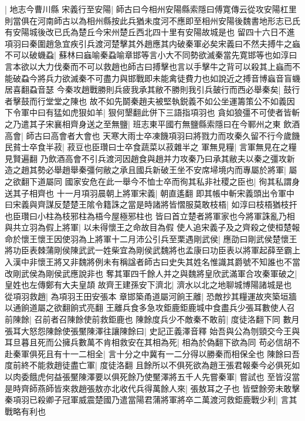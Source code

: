 |{
	地志今曹川縣}
宋義行至安陽|{
	師古曰今相州安陽縣索隱曰傅寛傳云從攻安陽杠里則當俱在河南師古以為相州縣按此兵猶未度河不應即至相州安陽後魏書地形志已氏有安陽城後改已氏為楚丘今宋州楚丘西北四十里有安陽故城是也}
留四十六日不進項羽曰秦圍趙急宜疾引兵渡河楚擊其外趙應其内破秦軍必矣宋義曰不然夫搏牛之蝱不可以破蟣蝨|{
	蘇林曰蝱喻秦蝨喻章邯等言小大不同勢欲滅秦當先寛邯等也如淳曰言本欲以大力伐秦而不可以救趙也師古曰搏擊也言以手擊牛之背可以殺其上蝱而不能破蝨今將兵力欲滅秦不可盡力與邯戰即未能禽徒費力也如說近之搏音博蝱音盲蟣居喜翻蝨音瑟}
今秦攻趙戰勝則兵疲我承其敝不勝則我引兵皷行而西必舉秦矣|{
	鼓行者擊鼓而行堂堂之陳也}
故不如先鬬秦趙夫被堅執鋭義不如公坐運籌策公不如義因下令軍中曰有猛如虎狠如羊|{
	狠何墾翻此併下三語指項羽也}
貪如狼彊不可使者皆斬之乃遣其子宋襄相齊身送之至無鹽|{
	班志東平國冇無鹽縣索隱曰在今鄆州之東}
飲酒高會|{
	師古曰高會者大會也}
天寒大雨士卒凍饑項羽曰將戮力而攻秦久留不行今歲饑民貧士卒食半菽|{
	菽豆也臣瓚曰士卒食蔬菜以菽雜半之}
軍無見糧|{
	言軍無見在之糧見賢遍翻}
乃飲酒高會不引兵渡河因趙食與趙并力攻秦乃曰承其敝夫以秦之彊攻新造之趙其勢必舉趙舉秦彊何敝之承且國兵新破王坐不安席埽境内而專屬於將軍|{
	屬之欲翻下道屬同}
國家安危在此一舉今不恤士卒而徇其私非社稷之臣也|{
	徇其私謂身送其子相齊也}
十一月項羽晨朝上將軍宋義|{
	朝直遙翻}
即其帳中斬宋義頭出令軍中曰宋義與齊謀反楚楚王隂令籍誅之當是時諸將皆慴服莫敢枝梧|{
	如淳曰枝梧猶枝扞也臣瓚曰小柱為枝邪柱為梧今屋極邪柱也}
皆曰首立楚者將軍家也今將軍誅亂乃相與共立羽為假上將軍|{
	以未得懷王之命故目為假}
使人追宋義子及之齊殺之使桓楚報命於懷王懷王因使羽為上將軍十二月沛公引兵至栗遇剛武侯|{
	應劭曰剛武侯楚懷王將功臣表棘蒲剛侯陳武武一姓柴宜為剛侯武魏將也孟康曰功臣表以將軍起薛至霸上入漢中非懷王將又非魏將例未有稱諡者師古曰史失其姓名惟識其爵號不知誰也不當改剛武侯為剛侯武應說非也}
奪其軍四千餘人并之與魏將皇欣武滿軍合攻秦軍破之|{
	皇姓也左傳鄭有大夫皇頡}
故齊王建孫安下濟北|{
	濟水以北之地聊城博陽諸城是也}
從項羽救趙|{
	為項羽王田安張本}
章邯築甬道屬河餉王離|{
	恐敵抄其糧運故夾築垣牆以通餉道屬之欲翻餉式亮翻}
王離兵食多急攻鉅鹿鉅鹿城中食盡兵少張耳數使人召前陳餘|{
	召前者召陳餘使前救鉅鹿也}
陳餘度兵少不敵秦不敢前|{
	度徒洛翻下同}
數月張耳大怒怨陳餘使張黶陳澤往讓陳餘曰|{
	史記正義澤音釋}
始吾與公為刎頸交今王與耳旦暮且死而公擁兵數萬不肯相救安在其相為死|{
	相為於偽翻下欲為同}
苟必信胡不赴秦軍俱死且有十一二相全|{
	言十分之中冀有一二分得以勝秦而相保全也}
陳餘曰吾度前終不能救趙徒盡亡軍|{
	度徒洛翻}
且餘所以不俱死欲為趙王張君報秦今必俱死如以肉委餓虎何益張黶陳澤要以俱死餘乃使黶澤將五千人先嘗秦軍|{
	嘗試也}
至皆沒當是時齊師燕師皆來救趙張敖亦北收代兵得萬餘人來|{
	張敖耳之子也}
皆壁餘旁未敢擊秦項羽已殺卿子冠軍威震楚國乃遣當陽君蒲將軍將卒二萬渡河救鉅鹿戰少利|{
	言其戰略有利也}
